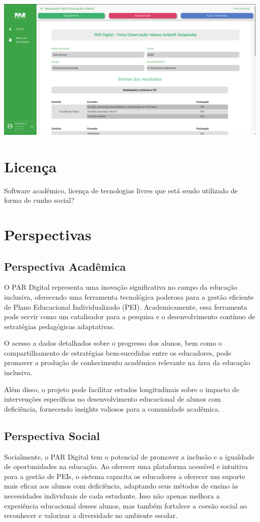 \documentclass[sigconf]{webmedia}
\begin{document}
\includegraphics[scale=0.12]{./imgs/perfil}

\section{Licença}
Software acadêmico, licença de tecnologias livres que está
 sendo utilizado de forma de cunho social?


\section{Perspectivas}

\subsection{Perspectiva Acadêmica}
O PAR Digital representa uma inovação significativa no campo 
da educação inclusiva, oferecendo uma ferramenta tecnológica 
poderosa para a gestão eficiente de Plano Educacional 
Individualizado (PEI). Academicamente, essa ferramenta pode 
servir como um catalisador para a pesquisa e o 
desenvolvimento contínuo de estratégias pedagógicas 
adaptativas. 

O acesso a dados detalhados sobre o progresso dos alunos, 
bem como o compartilhamento de estratégias bem-sucedidas 
entre os educadores, pode promover a produção de conhecimento
 acadêmico relevante na área da educação inclusiva. 

Além disso, o projeto pode facilitar estudos longitudinais 
sobre o impacto de intervenções específicas no 
desenvolvimento educacional de alunos com deficiência, 
fornecendo insights valiosos para a comunidade acadêmica.

\subsection{Perspectiva Social}
Socialmente, o PAR Digital tem o potencial de promover a 
inclusão e a igualdade de oportunidades na educação. Ao 
oferecer uma plataforma acessível e intuitiva para a 
gestão de PEIs, o sistema capacita os educadores a 
oferecer um suporte mais eficaz aos alunos com deficiência, 
adaptando seus métodos de ensino às necessidades 
individuais de cada estudante. Isso não apenas melhora 
a experiência educacional desses alunos, mas também 
fortalece a coesão social ao reconhecer e valorizar a 
diversidade no ambiente escolar.
\end{document}
